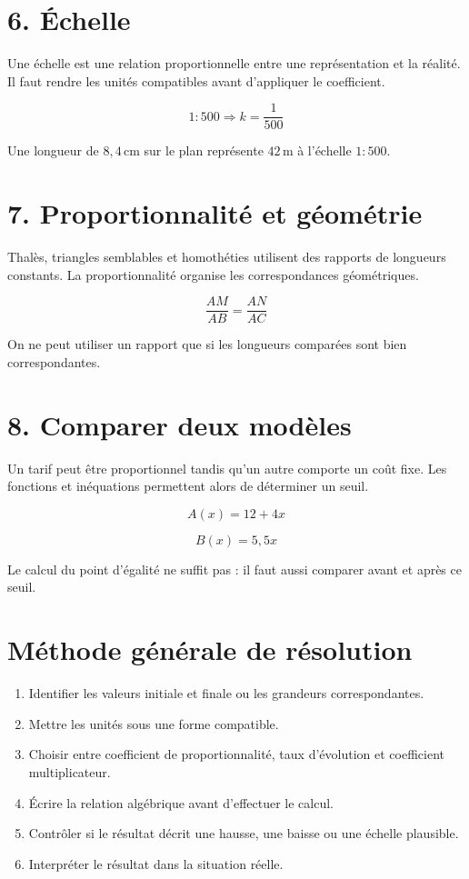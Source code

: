 \section{6. Échelle}
Une échelle est une relation proportionnelle entre une représentation et la réalité. Il faut rendre les unités compatibles avant d’appliquer le coefficient.

\[
1:500\Rightarrow k=\dfrac1{500}
\]

\begin{exemple}
Une longueur de $8{,}4\,\text{cm}$ sur le plan représente $42\,\text{m}$ à l’échelle $1:500$.
\end{exemple}

\section{7. Proportionnalité et géométrie}
Thalès, triangles semblables et homothéties utilisent des rapports de longueurs constants. La proportionnalité organise les correspondances géométriques.

\[
\dfrac{AM}{AB}=\dfrac{AN}{AC}
\]

\begin{exemple}
On ne peut utiliser un rapport que si les longueurs comparées sont bien correspondantes.
\end{exemple}

\section{8. Comparer deux modèles}
Un tarif peut être proportionnel tandis qu’un autre comporte un coût fixe. Les fonctions et inéquations permettent alors de déterminer un seuil.

\[
A(x)=12+4x
\]

\[
B(x)=5{,}5x
\]

\begin{exemple}
Le calcul du point d’égalité ne suffit pas : il faut aussi comparer avant et après ce seuil.
\end{exemple}

\section{Méthode générale de résolution}
\begin{methode}
\begin{enumerate}
\item Identifier les valeurs initiale et finale ou les grandeurs correspondantes.
\item Mettre les unités sous une forme compatible.
\item Choisir entre coefficient de proportionnalité, taux d’évolution et coefficient multiplicateur.
\item Écrire la relation algébrique avant d’effectuer le calcul.
\item Contrôler si le résultat décrit une hausse, une baisse ou une échelle plausible.
\item Interpréter le résultat dans la situation réelle.
\end{enumerate}
\end{methode}


